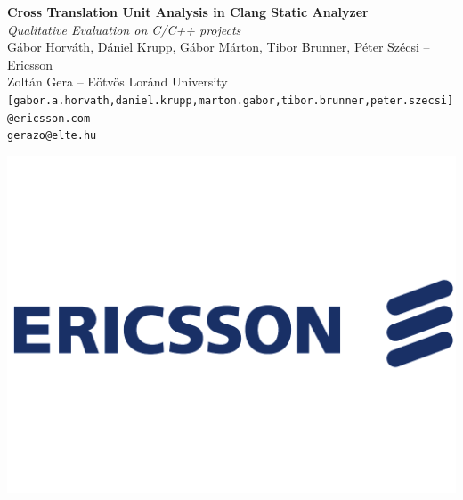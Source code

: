 \documentclass[a0,portrait]{a0poster}
\begin{document}


\begin{minipage}[b]{0.75\linewidth}
\veryHuge \color{NavyBlue} \textbf{Cross Translation Unit Analysis in Clang Static Analyzer} \color{Black}\\ %
\Huge\textit{ Qualitative Evaluation on C/C++ projects}\\[2cm] %
\Large G\'abor Horv\'ath, D\'aniel Krupp, G\'abor M\'arton, Tibor Brunner, P\'eter Sz\'ecsi -- Ericsson \\%
\Large Zolt\'an Gera -- E\"otv\"os Lor\'and University\\[0.4cm] %
\large \texttt{[gabor.a.horvath,daniel.krupp,marton.gabor,tibor.brunner,peter.szecsi]@ericsson.com}\\ \large \texttt{gerazo@elte.hu}\\
\end{minipage}
%
\begin{minipage}[b]{0.25\linewidth}
\includegraphics[width=20cm]{logo.png}\\
\end{minipage}
\end{document}
